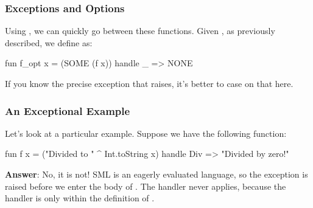\documentclass[aspectratio=169]{beamer}
\begin{document}
\begin{frame}[fragile]
  \frametitle{Exceptions and Options}

  Using , we can quickly go between these functions. Given 
  , as previously described, we define  as:
  \begin{codeblock}
    fun f_opt x = (SOME (f x)) handle _ => NONE
  \end{codeblock}

  \pause
  \vspace{\fill}


  \pause
  \vspace{\fill}


  \pause
  \vspace{\fill}

  If you know the precise exception that  raises, it's better to case on
  that here.
\end{frame}

\begin{frame}[fragile]
  \frametitle{An Exceptional Example}

  Let's look at a particular example. Suppose we have the following function:

  \pause
  \vspace{\fill}

  \begin{codeblock}
    fun f x = 
      ("Divided to " ^ Int.toString x) 
      handle Div => "Divided by zero!" 
  \end{codeblock}

  \pause
  \vspace{\fill}


  \pause
  \vspace{\fill}

  \textbf{Answer}: No, it is not! SML is an eagerly evaluated language, so the exception 
  is raised before we enter the body of . The handler never applies, because the handler is
  only within the definition of .
\end{frame}
\end{document}

